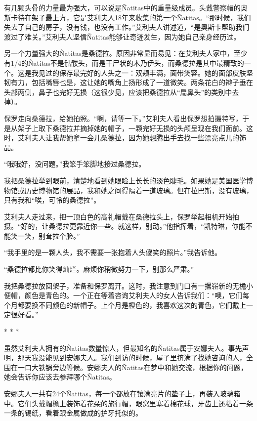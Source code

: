 \documentclass[12pt,oneside]{book}
\begin{document}
\begin{bookref}[frametitle={\cite{好好告别}}]
有几颗头骨的力量最为强大，可以说是Ñatitas中的重量级成员。头戴警察帽的奥斯卡待在架子最上方，它是艾利夫人18年来收集的第一个Ñatitas。“那时候，我们失去了自己的房子，没有钱，也没有工作。”艾利夫人讲述道，“是奥斯卡帮助我们渡过了难关。”艾利夫人坚信Ñatitas能够让奇迹发生，因为她自己亲身经历过。

另一个力量强大的Ñatitas是桑德拉。原因非常显而易见：在艾利夫人家中，至少有1/4的Ñatitas不是骷髅头，而是干尸状的木乃伊头，而桑德拉是其中最精致的一个。这是我见过的保存最完好的人头之一：双颊丰满，面带笑容。她的面部皮肤坚韧有力，包括嘴唇也是，这让她的嘴角上扬形成了一道微笑。两条花白的辫子垂在头部两侧，鼻子也完好无损（这很少见，应该把桑德拉从“扁鼻头”的类别中去掉）。

保罗走向桑德拉，给她拍照。“啊，请等一下。”艾利夫人看出保罗想拍摄特写，于是从架子上取下桑德拉并摘掉她的帽子，一颗完好无损的头颅呈现在我们面前。这时，艾利夫人让我帮她拿一会儿桑德拉，因为她想腾出手去找一些漂亮点儿的饰品。

“哦哦好，没问题。”我笨手笨脚地接过桑德拉。

我把桑德拉举到眼前，清楚地看到她眼睑上长长的淡色睫毛。如果她是美国医学博物馆或历史博物馆的展品，我和她之间得隔着一道玻璃。但在拉巴斯，没有玻璃，只有我和“唉，可怜的桑德拉”。

艾利夫人走过来，把一顶白色的高礼帽戴在桑德拉头上，保罗举起相机开始拍摄。“好的，让桑德拉更靠近你一些。就这样，别动。”他指挥着，“凯特琳，你能不能笑一笑，别耷拉个脸。”

“我手里的是一颗人头，我不需要一张抱着人头傻笑的照片。”我告诉他。

“桑德拉都比你笑得灿烂。麻烦你稍微努力一下，别那么严肃。”

我把桑德拉放回架子，准备和保罗离开。这时，我注意到门口有一摞崭新的无檐小便帽，颜色是青色的。一个正在等着咨询艾利夫人的女人告诉我们：“噢，它们每个月都要换不同颜色的新帽子。上个月是橙色的，我喜欢这次的青色，它们戴上一定很好看。”

\begin{center}
* * *
\end{center}

虽然艾利夫人拥有的Ñatitas数量惊人，但最知名的Ñatitas属于安娜夫人。事先声明，那天我没能见到安娜夫人。我们到访的时候，屋子里挤满了找她咨询的人，全围在一口大铁锅旁边等候。安娜夫人的Ñatitas在梦中和她交流，根据你的问题，她会告诉你应该去参拜哪个Ñatitas。

安娜夫人一共有24个Ñatitas，每一个都放在镶满亮片的垫子上，再装入玻璃箱中。它们头戴帽檐上装饰着花朵的旅行帽，眼窝里塞着棉花球，牙齿上还粘着一条一条的锡纸，看着跟金属做成的护牙托似的。


\end{bookref}
\end{document}
